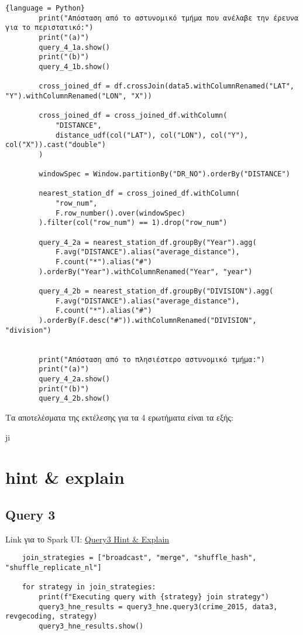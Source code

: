 \documentclass{article}
\begin{document}
\begin{lstlisting}{language = Python}
        print("Απόσταση από το αστυνομικό τμήμα που ανέλαβε την έρευνα για το περιστατικό:")
        print("(a)")
        query_4_1a.show() 
        print("(b)")
        query_4_1b.show() 

        cross_joined_df = df.crossJoin(data5.withColumnRenamed("LAT", "Y").withColumnRenamed("LON", "X"))

        cross_joined_df = cross_joined_df.withColumn(
            "DISTANCE",
            distance_udf(col("LAT"), col("LON"), col("Y"), col("X")).cast("double")
        )

        windowSpec = Window.partitionBy("DR_NO").orderBy("DISTANCE")

        nearest_station_df = cross_joined_df.withColumn(
            "row_num",
            F.row_number().over(windowSpec)
        ).filter(col("row_num") == 1).drop("row_num")

        query_4_2a = nearest_station_df.groupBy("Year").agg(
            F.avg("DISTANCE").alias("average_distance"),
            F.count("*").alias("#")
        ).orderBy("Year").withColumnRenamed("Year", "year")

        query_4_2b = nearest_station_df.groupBy("DIVISION").agg(
            F.avg("DISTANCE").alias("average_distance"),
            F.count("*").alias("#")
        ).orderBy(F.desc("#")).withColumnRenamed("DIVISION", "division")


        print("Απόσταση από το πλησιέστερο αστυνομικό τμήμα:")
        print("(a)")
        query_4_2a.show()
        print("(b)")
        query_4_2b.show()
\end{lstlisting}

Τα αποτελέσματα της εκτέλεσης για τα 4 ερωτήματα είναι τα εξής: 

ji
\section*{hint \& explain}

\subsection*{Query 3}
Link για το Spark UI:
\href{http://83.212.81.191:18080/history/application_1705357398960_0018/jobs/} {Query3 Hint \& Explain}
\begin{lstlisting}
    join_strategies = ["broadcast", "merge", "shuffle_hash", "shuffle_replicate_nl"]

    for strategy in join_strategies:
        print(f"Executing query with {strategy} join strategy")
        query3_hne_results = query3_hne.query3(crime_2015, data3, revgecoding, strategy)
        query3_hne_results.show()
\end{lstlisting}
\end{document}
